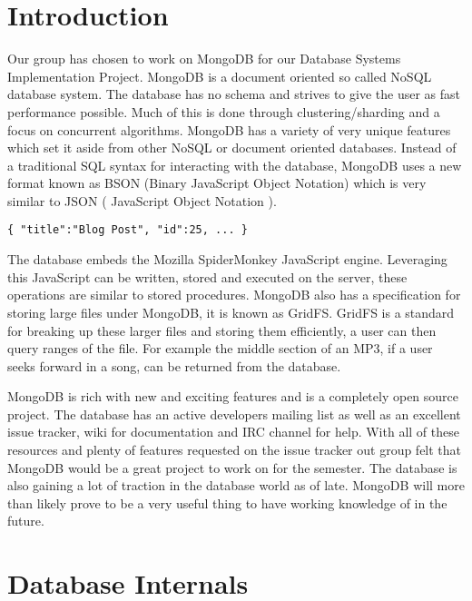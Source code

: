 \documentclass{dependencies/acm_proc_article-sp}
\begin{document}
\section{Introduction}
Our group has chosen to work on MongoDB for our Database Systems
Implementation Project. MongoDB is a document oriented so called NoSQL
database system. The database has no schema and strives to give the user
as fast performance possible. Much of this is done through clustering/sharding
and a focus on concurrent algorithms. MongoDB has a variety of very unique
features which set it aside from other NoSQL or document oriented databases.
Instead of a traditional SQL syntax for interacting with the database, MongoDB uses
a new format known as BSON (Binary JavaScript Object Notation) which is very similar
to JSON ( JavaScript Object Notation ).
\begin{lstlisting}
{ "title":"Blog Post", "id":25, ... }
\end{lstlisting}The database embeds the Mozilla SpiderMonkey JavaScript engine.
Leveraging this JavaScript can be written, stored and executed on the server, these
operations are similar to stored procedures. MongoDB also has a specification for storing
large files under MongoDB, it is known as GridFS. GridFS is a standard for breaking up these larger
files and storing them efficiently, a user can then query ranges of the file. For example the middle section
of an MP3, if a user seeks forward in a song, can be returned from the database.

MongoDB is rich with new and exciting features and is a completely open source project.
The database has an active developers mailing list as well as an excellent issue tracker,
wiki for documentation and IRC channel for help. With all of these resources and plenty
of features requested on the issue tracker out group felt that MongoDB would be a great
project to work on for the semester. The database is also gaining a lot of traction in the
database world as of late. MongoDB will more than likely prove to be a very useful thing
to have working knowledge of in the future.

\section{Database Internals}
\end{document}
